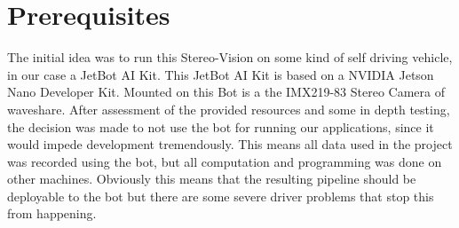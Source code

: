 \documentclass[journal,onecolumn]{IEEEtran}
\begin{document}
\section{Prerequisites}
\noindent The initial idea was to run this Stereo-Vision on some kind of self driving vehicle, in our case a JetBot AI Kit\cite{jetbot_wiki}. This JetBot AI Kit is based on a NVIDIA Jetson Nano Developer Kit\cite{nvidia_jetson}. Mounted on this Bot is a the IMX219-83 Stereo Camera\cite{cam_wiki} of waveshare. After assessment of the provided resources and some in depth testing, the decision was made to not use the bot for running our applications, since it would impede development tremendously. This means all data used in the project was recorded using the bot, but all computation and programming was done on other machines. Obviously this means that the resulting pipeline should be deployable to the bot but there are some severe driver problems that stop this from happening.
\end{document}
